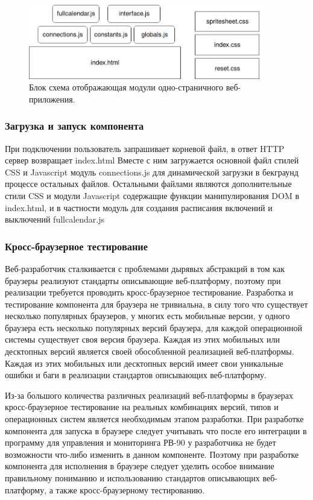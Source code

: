 \begin{figure}[h!]
    \centering
    \includegraphics[width=0.9\textwidth]{webapp_modules_blocks.png}
    \caption{Блок схема отображающая модули одно-страничного веб-приложения.}
\end{figure}

\subsubsection{ Загрузка и запуск компонента}
При подключении пользователь запрашивает корневой файл, в ответ HTTP сервер возвращает index.html
Вместе с ним загружается основной файл стилей CSS и Javascript модуль connections.js для динамической загрузки в бекграунд процессе остальных файлов. Остальными файлами являются дополнительные стили CSS и модули Javascript содержащие функции манипулирования DOM в index.html, и в частности модуль для создания расписания включений и выключений fullcalendar.js  

\subsubsection{ Кросс-браузерное тестирование}
Веб-разработчик сталкивается с проблемами дырявых абстракций в том как браузеры реализуют стандарты описывающие веб-платформу, поэтому при реализации требуется проводить кросс-браузерное тестирование.
Разработка и тестирование компонента для браузера не тривиальна, в силу того что 
существует несколько популярных браузеров, у многих есть мобильные версии, у одного браузера есть несколько популярных версий браузера, для каждой операционной системы существует своя версия браузера. Каждая из этих мобильных или десктопных версий является своей обособленной реализацией веб-платформы. Каждая из этих мобильных или десктопных версий имеет свои уникальные ошибки и баги в реализации стандартов описывающих веб-платформу. 

Из-за большого количества различных реализаций веб-платформы в браузерах кросс-браузерное тестирование на реальных комбинациях версий, типов и операционных систем является необходимым этапом разработки. При разработке компонента для запуска в браузере следует учитывать что после его интеграции в программу для управления и мониторинга РВ-90 у разработчика не будет возможности что-либо изменить в данном компоненте. Поэтому при разработке компонента для исполнения в браузере следует уделить особое внимание правильному пониманию и использованию стандартов описывающих веб-платформу, а также кросс-браузерному тестированию. 

